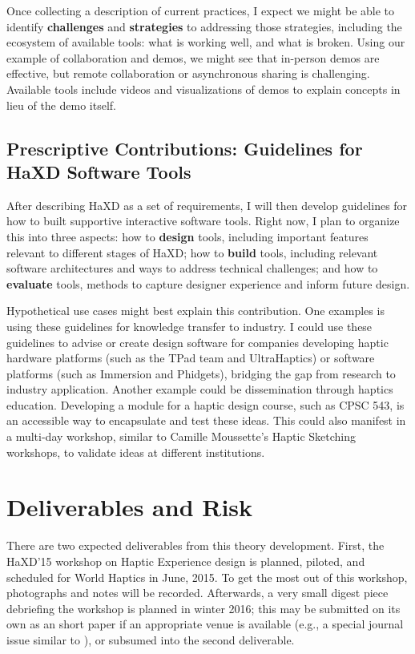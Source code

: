 Once collecting a description of current practices, I expect we might be able to identify \textbf{challenges} and \textbf{strategies} to addressing those strategies, including the ecosystem of available tools: what is working well, and what is broken.
Using our example of collaboration and demos, we might see that in-person demos are effective, but
remote collaboration or asynchronous sharing is challenging. %
Available tools include videos and visualizations of demos to explain concepts in lieu of the demo itself.

\subsection{Prescriptive Contributions: Guidelines for HaXD Software Tools}
After describing HaXD as a set of requirements, I will then develop guidelines for how to built supportive interactive software tools.
Right now, I plan to organize this into three aspects: how to \textbf{design} tools, including important features relevant to different stages of HaXD; how to \textbf{build} tools, including relevant software architectures and ways to address technical challenges; and how to \textbf{evaluate} tools, methods to capture designer experience and inform future design.

Hypothetical use cases might best explain this contribution.
One examples is using these guidelines for knowledge transfer to industry.
I could use these guidelines to advise or create design software for companies developing haptic hardware platforms (such as the TPad team and UltraHaptics) or software platforms (such as Immersion and Phidgets), bridging the gap from research to industry application.
Another example could be dissemination through haptics education.
Developing a module for a haptic design course, such as CPSC 543, is an accessible way to encapsulate and test these ideas.
This could also manifest in a multi-day workshop, similar to Camille Moussette's Haptic Sketching workshops, to validate ideas at different institutions.



\section{Deliverables and Risk}
There are two expected deliverables from this theory development.
First, the HaXD'15 workshop on Haptic Experience design is planned, piloted, and scheduled for World Haptics in June, 2015. 
To get the most out of this workshop, photographs and notes will be recorded.
Afterwards, a very small digest piece debriefing the workshop is planned in winter 2016; this may be submitted on its own as an short paper if an appropriate venue is available (e.g., a special journal issue similar to \cite{Jones2014}), or subsumed into the second deliverable.


